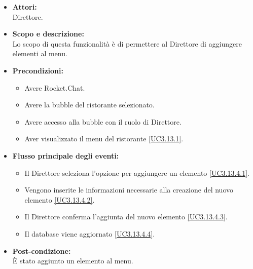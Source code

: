 
\begin{itemize}
	\item \textbf{Attori:}
	\\Direttore.
	\item \textbf{Scopo e descrizione:} 
	\\Lo scopo di questa funzionalità è di permettere al Direttore di aggiungere elementi al menu.
	\item \textbf{Precondizioni:}
	\begin{itemize}
		\item Avere Rocket.Chat.
		\item Avere la bubble del ristorante selezionato.
		\item Avere accesso alla bubble con il ruolo di Direttore.
		\item Aver visualizzato il menu del ristorante \ref{UC3.13.1}.
	\end{itemize}
	\item \textbf{Flusso principale degli eventi:}
	\begin{itemize}
		\item Il Direttore seleziona l'opzione per aggiungere un elemento \ref{UC3.13.4.1}.
		\item Vengono inserite le informazioni necessarie alla creazione del nuovo elemento \ref{UC3.13.4.2}.
		\item Il Direttore conferma l'aggiunta del nuovo elemento \ref{UC3.13.4.3}.
		\item Il database viene aggiornato \ref{UC3.13.4.4}.
	\end{itemize}
	\item \textbf{Post-condizione:}
	\\È stato aggiunto un elemento al menu.
\end{itemize}


